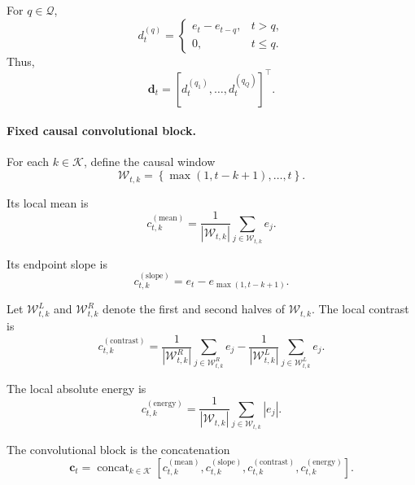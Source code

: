 \documentclass[review,number,sort&compress]{elsarticle}
\begin{document}
For $q\in\mathcal{Q}$,
\begin{equation}
    d_t^{(q)}
    =
    \begin{cases}
        e_t-e_{t-q}, & t>q,\\
        0, & t\leq q.
    \end{cases}
\end{equation}
Thus,
\begin{equation}
    \bm{d}_t
    =
    \left[
    d_t^{(q_1)},\ldots,d_t^{(q_Q)}
    \right]^\top.
\end{equation}

\paragraph{Fixed causal convolutional block.}

For each $k\in\mathcal{K}$, define the causal window
\begin{equation}
    \mathcal{W}_{t,k}
    =
    \left\{
    \max(1,t-k+1),\ldots,t
    \right\}.
\end{equation}

Its local mean is
\begin{equation}
    c_{t,k}^{(\mathrm{mean})}
    =
    \frac{1}{|\mathcal{W}_{t,k}|}
    \sum_{j\in\mathcal{W}_{t,k}}e_j.
\end{equation}

Its endpoint slope is
\begin{equation}
    c_{t,k}^{(\mathrm{slope})}
    =
    e_t-e_{\max(1,t-k+1)}.
\end{equation}

Let $\mathcal{W}_{t,k}^{L}$ and $\mathcal{W}_{t,k}^{R}$ denote the first and
second halves of $\mathcal{W}_{t,k}$. The local contrast is
\begin{equation}
    c_{t,k}^{(\mathrm{contrast})}
    =
    \frac{1}{|\mathcal{W}_{t,k}^{R}|}
    \sum_{j\in\mathcal{W}_{t,k}^{R}}e_j
    -
    \frac{1}{|\mathcal{W}_{t,k}^{L}|}
    \sum_{j\in\mathcal{W}_{t,k}^{L}}e_j.
\end{equation}

The local absolute energy is
\begin{equation}
    c_{t,k}^{(\mathrm{energy})}
    =
    \frac{1}{|\mathcal{W}_{t,k}|}
    \sum_{j\in\mathcal{W}_{t,k}}|e_j|.
\end{equation}

The convolutional block is the concatenation
\begin{equation}
    \bm{c}_t
    =
    \operatorname{concat}_{k\in\mathcal{K}}
    \left[
    c_{t,k}^{(\mathrm{mean})},
    c_{t,k}^{(\mathrm{slope})},
    c_{t,k}^{(\mathrm{contrast})},
    c_{t,k}^{(\mathrm{energy})}
    \right].
\end{equation}
\end{document}
